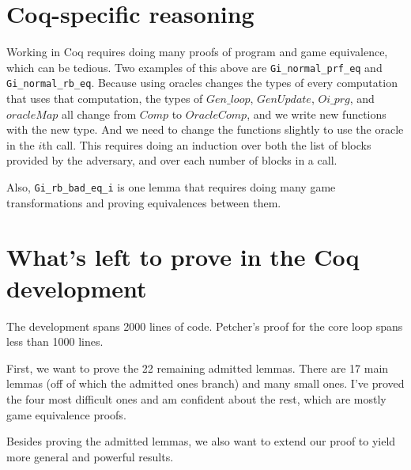 \documentclass[12pt,lot, lof]{puthesis}
\newcommand{\li} {\lstinline}
\begin{document}
{\section{Coq-specific reasoning}

Working in Coq requires doing many proofs of program and game equivalence, which can be tedious. Two examples of this above are \li|Gi_normal_prf_eq| and \li|Gi_normal_rb_eq|. Because using oracles changes the types of every computation that uses that computation, the types of $Gen\_loop$, $GenUpdate$, $Oi\_prg$, and $oracleMap$ all change from $Comp$ to $OracleComp$, and we write new functions with the new type. And we need to change the functions slightly to use the oracle in the $i$th call. This requires doing an induction over both the list of blocks provided by the adversary, and over each number of blocks in a call.

Also, \li|Gi_rb_bad_eq_i| is one lemma that requires doing many game transformations and proving equivalences between them.

\section{What's left to prove in the Coq development}

The development spans 2000 lines of code. Petcher's proof for the core loop spans less than 1000 lines.

First, we want to prove the 22 remaining admitted lemmas. There are 17 main lemmas (off of which the admitted ones branch) and many small ones. I've proved the four most difficult ones and am confident about the rest, which are mostly game equivalence proofs. 

Besides proving the admitted lemmas, we also want to extend our proof to yield more general and powerful results.

}
\end{document}
